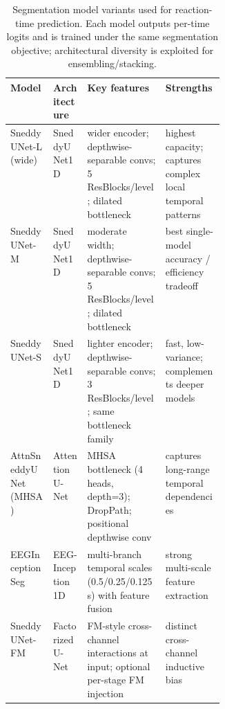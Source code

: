\documentclass[12pt]{article}
\begin{document}
\begin{table}[t!]
\caption{Segmentation model variants used for reaction-time prediction. Each model outputs per-time logits and is trained under the same segmentation objective; architectural diversity is exploited for ensembling/stacking.}
\label{tab:rt_seg_models}
\small
\centering
\renewcommand{\arraystretch}{1.2}
\setlength{\tabcolsep}{4pt} %

\begin{tabularx}{\linewidth}{@{}
  >{\RaggedRight\arraybackslash}p{0.20\linewidth}
  >{\RaggedRight\arraybackslash}p{0.16\linewidth}
  >{\RaggedRight\arraybackslash}X
  >{\RaggedRight\arraybackslash}X
@{}}
\hline
\textbf{Model} & \textbf{Architecture} & \textbf{Key features} & \textbf{Strengths} \\
\hline

SneddyUNet-L (wide)
& SneddyUNet1D
& wider encoder; depthwise-separable convs; 5 ResBlocks/level; dilated bottleneck
& highest capacity; captures complex local temporal patterns \\

SneddyUNet-M
& SneddyUNet1D
& moderate width; depthwise-separable convs; 5 ResBlocks/level; dilated bottleneck
& best single-model accuracy / efficiency tradeoff \\

SneddyUNet-S
& SneddyUNet1D
& lighter encoder; depthwise-separable convs; 3 ResBlocks/level; same bottleneck family
& fast, low-variance; complements deeper models \\

AttnSneddyUNet (MHSA)
& Attention U-Net
& MHSA bottleneck (4 heads, depth=3); DropPath; positional depthwise conv
& captures long-range temporal dependencies \\

EEGInceptionSeg
& EEG-Inception 1D
& multi-branch temporal scales (0.5/0.25/0.125\,s) with feature fusion
& strong multi-scale feature extraction \\

SneddyUNet-FM
& Factorized U-Net
& FM-style cross-channel interactions at input; optional per-stage FM injection
& distinct cross-channel inductive bias \\
\hline
\end{tabularx}
\end{table}
\end{document}
